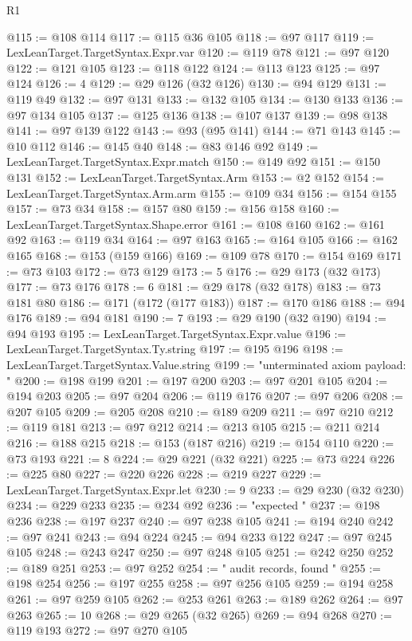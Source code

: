 \begin{lexlean}{R1}
\begin{coremodule}
@115 := @108 @114
@117 := @115 @36 @105
@118 := @97 @117
@119 := LexLeanTarget.TargetSyntax.Expr.var
@120 := @119 @78
@121 := @97 @120
@122 := @121 @105
@123 := @118 @122
@124 := @113 @123
@125 := @97 @124
@126 := 4
@129 := @29 @126 (@32 @126)
@130 := @94 @129
@131 := @119 @49
@132 := @97 @131
@133 := @132 @105
@134 := @130 @133
@136 := @97 @134 @105
@137 := @125 @136
@138 := @107 @137
@139 := @98 @138
@141 := @97 @139 @122
@143 := @93 (@95 @141)
@144 := @71 @143
@145 := @10 @112
@146 := @145 @40
@148 := @83 @146 @92
@149 := LexLeanTarget.TargetSyntax.Expr.match
@150 := @149 @92
@151 := @150 @131
@152 := LexLeanTarget.TargetSyntax.Arm
@153 := @2 @152
@154 := LexLeanTarget.TargetSyntax.Arm.arm
@155 := @109 @34
@156 := @154 @155
@157 := @73 @34
@158 := @157 @80
@159 := @156 @158
@160 := LexLeanTarget.TargetSyntax.Shape.error
@161 := @108 @160
@162 := @161 @92
@163 := @119 @34
@164 := @97 @163
@165 := @164 @105
@166 := @162 @165
@168 := @153 (@159 @166)
@169 := @109 @78
@170 := @154 @169
@171 := @73 @103
@172 := @73 @129
@173 := 5
@176 := @29 @173 (@32 @173)
@177 := @73 @176
@178 := 6
@181 := @29 @178 (@32 @178)
@183 := @73 @181 @80
@186 := @171 (@172 (@177 @183))
@187 := @170 @186
@188 := @94 @176
@189 := @94 @181
@190 := 7
@193 := @29 @190 (@32 @190)
@194 := @94 @193
@195 := LexLeanTarget.TargetSyntax.Expr.value
@196 := LexLeanTarget.TargetSyntax.Ty.string
@197 := @195 @196
@198 := LexLeanTarget.TargetSyntax.Value.string
@199 := "unterminated axiom payload: "
@200 := @198 @199
@201 := @197 @200
@203 := @97 @201 @105
@204 := @194 @203
@205 := @97 @204
@206 := @119 @176
@207 := @97 @206
@208 := @207 @105
@209 := @205 @208
@210 := @189 @209
@211 := @97 @210
@212 := @119 @181
@213 := @97 @212
@214 := @213 @105
@215 := @211 @214
@216 := @188 @215
@218 := @153 (@187 @216)
@219 := @154 @110
@220 := @73 @193
@221 := 8
@224 := @29 @221 (@32 @221)
@225 := @73 @224
@226 := @225 @80
@227 := @220 @226
@228 := @219 @227
@229 := LexLeanTarget.TargetSyntax.Expr.let
@230 := 9
@233 := @29 @230 (@32 @230)
@234 := @229 @233
@235 := @234 @92
@236 := "expected "
@237 := @198 @236
@238 := @197 @237
@240 := @97 @238 @105
@241 := @194 @240
@242 := @97 @241
@243 := @94 @224
@245 := @94 @233 @122
@247 := @97 @245 @105
@248 := @243 @247
@250 := @97 @248 @105
@251 := @242 @250
@252 := @189 @251
@253 := @97 @252
@254 := " audit records, found "
@255 := @198 @254
@256 := @197 @255
@258 := @97 @256 @105
@259 := @194 @258
@261 := @97 @259 @105
@262 := @253 @261
@263 := @189 @262
@264 := @97 @263
@265 := 10
@268 := @29 @265 (@32 @265)
@269 := @94 @268
@270 := @119 @193
@272 := @97 @270 @105

\end{coremodule}
\end{lexlean}
